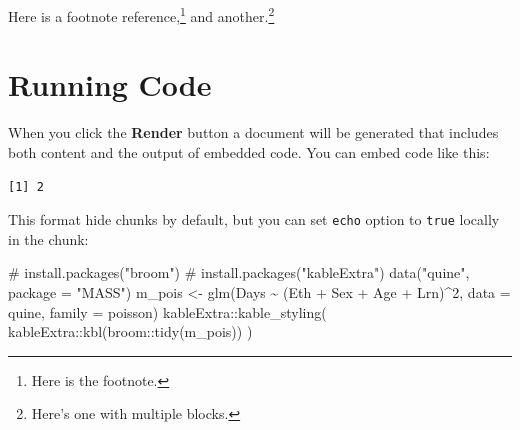 \documentclass[
  letterpaper,
  12pt,
  oneside,
  spanish,
  doublespacing,
  headsepline,
  parskip]{MastersDoctoralThesis}
\newenvironment{Shaded}{\begin{snugshade}}{\end{snugshade}}
\newcommand{\AttributeTok}[1]{\textcolor[rgb]{0.40,0.45,0.13}{#1}}
\newcommand{\CommentTok}[1]{\textcolor[rgb]{0.37,0.37,0.37}{#1}}
\newcommand{\DecValTok}[1]{\textcolor[rgb]{0.68,0.00,0.00}{#1}}
\newcommand{\FunctionTok}[1]{\textcolor[rgb]{0.28,0.35,0.67}{#1}}
\newcommand{\NormalTok}[1]{\textcolor[rgb]{0.00,0.23,0.31}{#1}}
\newcommand{\OtherTok}[1]{\textcolor[rgb]{0.00,0.23,0.31}{#1}}
\newcommand{\SpecialCharTok}[1]{\textcolor[rgb]{0.37,0.37,0.37}{#1}}
\newcommand{\StringTok}[1]{\textcolor[rgb]{0.13,0.47,0.30}{#1}}
\begin{document}
Here is a footnote reference,\footnote{Here is the footnote.} and
another.\footnote{Here's one with multiple blocks.}

\hypertarget{running-code}{%
\section{Running Code}\label{running-code}}

When you click the \textbf{Render} button a document will be generated
that includes both content and the output of embedded code. You can
embed code like this:

\begin{verbatim}
[1] 2
\end{verbatim}

This format hide chunks by default, but you can set \texttt{echo} option
to \texttt{true} locally in the chunk:

\begin{Shaded}
\begin{Highlighting}[]
\CommentTok{\# install.packages("broom")}
\CommentTok{\# install.packages("kableExtra")}
\FunctionTok{data}\NormalTok{(}\StringTok{"quine"}\NormalTok{, }\AttributeTok{package =} \StringTok{"MASS"}\NormalTok{)}
\NormalTok{m\_pois }\OtherTok{\textless{}{-}} \FunctionTok{glm}\NormalTok{(Days }\SpecialCharTok{\textasciitilde{}}\NormalTok{ (Eth }\SpecialCharTok{+}\NormalTok{ Sex }\SpecialCharTok{+}\NormalTok{ Age }\SpecialCharTok{+}\NormalTok{ Lrn)}\SpecialCharTok{\^{}}\DecValTok{2}\NormalTok{, }\AttributeTok{data =}\NormalTok{ quine, }\AttributeTok{family =}\NormalTok{ poisson)}
\NormalTok{kableExtra}\SpecialCharTok{::}\FunctionTok{kable\_styling}\NormalTok{(}
\NormalTok{  kableExtra}\SpecialCharTok{::}\FunctionTok{kbl}\NormalTok{(broom}\SpecialCharTok{::}\FunctionTok{tidy}\NormalTok{(m\_pois))}
\NormalTok{)}
\end{Highlighting}
\end{Shaded}
\end{document}
